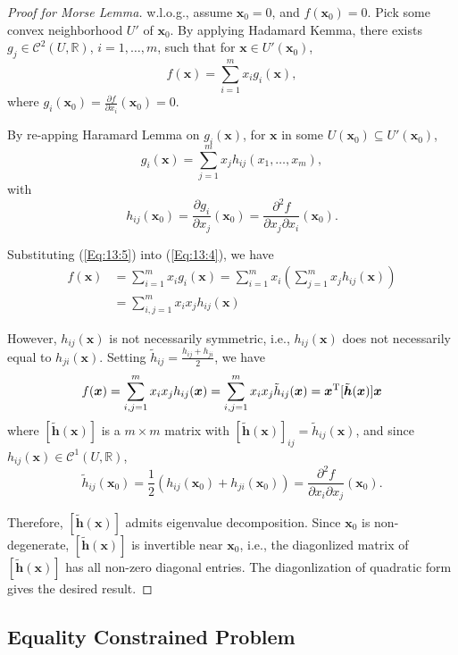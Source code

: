 \begin{proof}[Proof for Morse Lemma]
w.l.o.g., assume $\bm x_0=0$, and $f(\bm x_0)=0$. Pick some convex neighborhood $U'$ of $\bm x_0$. By applying Hadamard Kemma, there exists $g_j\in\mathcal{C}^2(U,\mathbb{R})$, $i=1,\dots,m$, such that for $\bm x\in U'(\bm x_0)$,
\begin{equation}\label{Eq:13:4}
f(\bm x)=\sum_{i=1}^mx_ig_i(\bm x),
\end{equation}
where $g_i(\bm x_0)=\frac{\partial f}{\partial x_i}(\bm x_0)=0$. 

By re-apping Haramard Lemma on $g_i(\bm x)$, for $\bm x$ in some $U(\bm x_0)\subseteq U'(\bm x_0)$,
\begin{equation}\label{Eq:13:5}
g_i(\bm x)=\sum_{j=1}^mx_jh_{ij}(x_1,\dots,x_m),
\end{equation}
with
 \[
 h_{ij}(\bm x_0)=\frac{\partial g_i}{\partial x_j}(\bm x_0)=\frac{\partial^2f}{\partial x_j\partial x_i}(\bm x_0).
 \]

Substituting (\ref{Eq:13:5}) into (\ref{Eq:13:4}), we have
\begin{align*}
f(\bm x)&=\sum_{i=1}^mx_ig_i(\bm x)=\sum_{i=1}^mx_i\left(
\sum_{j=1}^mx_jh_{ij}(\bm x)
\right)\\
&=\sum_{i,j=1}^mx_ix_jh_{ij}(\bm x)
\end{align*}

However, $h_{ij}(\bm x)$ is not necessarily symmetric, i.e., $h_{ij}(\bm x)$ does not necessarily equal to $h_{ji}(\bm x)$. Setting $\tilde{h}_{ij}=\frac{h_{ij}+h_{ji}}{2}$, we have
\begin{equation}\label{Eq:13:7}
f(\bm x)=\sum_{i,j=1}^mx_ix_jh_{ij}(\bm x)
=
\sum_{i,j=1}^mx_ix_j\tilde h_{ij}(\bm x)
=
\bm x\trans[\tilde{\bm h}(\bm x)]\bm x
\end{equation}
where $[\tilde{\bm h}(\bm x)]$ is a $m\times m$ matrix with $[\tilde{\bm h}(\bm x)]_{ij}=\tilde h_{ij}(\bm x)$, and since $h_{ij}(\bm x)\in\mathcal{C}^1(U,\mathbb{R})$, 
\[
\tilde h_{ij}(\bm x_0)=\frac{1}{2}(h_{ij}(\bm x_0)+h_{ji}(\bm x_0))=
\frac{\partial^2f}{\partial x_i\partial x_j}(\bm x_0).
\]

Therefore, $[\tilde{\bm h}(\bm x)]$ admits eigenvalue decomposition. Since $\bm x_0$ is non-degenerate, $[\tilde{\bm h}(\bm x)]$ is invertible near $\bm x_0$, i.e., the diagonlized matrix of $[\tilde{\bm h}(\bm x)]$ has all non-zero diagonal entries. The diagonlization of quadratic form gives the desired result.
\end{proof}

\subsection{Equality Constrained Problem}

